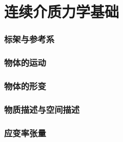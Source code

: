 \documentclass[zihao=-4,linespread=1.5,heading=true,a4paper,twoside]{ctexart}
\begin{document}
\newpage\part{连续介质力学基础}
\section{标架与参考系}


\section{物体的运动}


\section{物体的形变}


\section{物质描述与空间描述}


\section{应变率张量}







\end{document}
